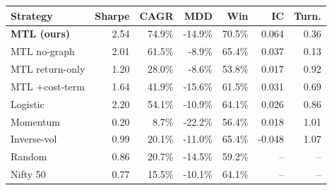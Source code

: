 \begin{tabular}{lrrrrrr}
\toprule
Strategy & Sharpe & CAGR & MDD & Win & IC & Turn. \\
\midrule
\textbf{MTL (ours)} & 2.54 & 74.9\% & -14.9\% & 70.5\% & 0.064 & 0.36 \\
MTL no-graph & 2.01 & 61.5\% & -8.9\% & 65.4\% & 0.037 & 0.13 \\
MTL return-only & 1.20 & 28.0\% & -8.6\% & 53.8\% & 0.017 & 0.92 \\
MTL +cost-term & 1.64 & 41.9\% & -15.6\% & 61.5\% & 0.031 & 0.69 \\
Logistic & 2.20 & 54.1\% & -10.9\% & 64.1\% & 0.026 & 0.86 \\
Momentum & 0.20 & 8.7\% & -22.2\% & 56.4\% & 0.018 & 1.01 \\
Inverse-vol & 0.99 & 20.1\% & -11.0\% & 65.4\% & -0.048 & 1.07 \\
Random & 0.86 & 20.7\% & -14.5\% & 59.2\% & -- & -- \\
Nifty 50 & 0.77 & 15.5\% & -10.1\% & 64.1\% & -- & -- \\
\bottomrule
\end{tabular}
